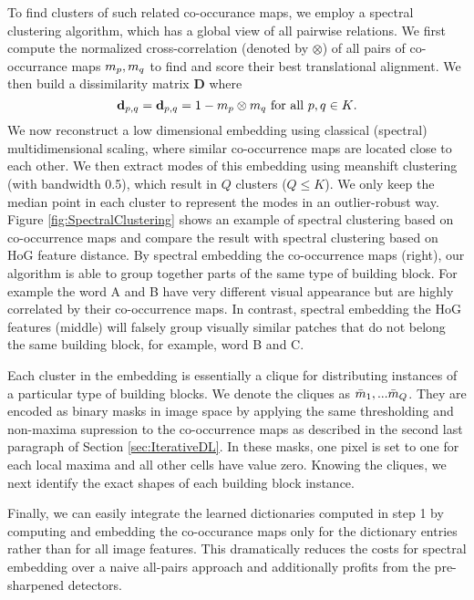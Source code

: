 \documentclass{acmtog}
\begin{document}
To find clusters of such related co-occurance maps, we employ a spectral clustering algorithm, which has a global view of all pairwise relations. We first compute the normalized cross-correlation (denoted by $\otimes$) of all pairs of co-occurrance maps $m_{p},m_{q}$ to find and score their best translational alignment. We then build a dissimilarity matrix $\textbf{D}$ where
%
\begin{equation}
\textbf{d}_{p, q} = \textbf{d}_{p, q} = 1 - m_{p} \otimes m_{q} \text{ for all } p,q \in K\text{.}
\label{eq:distanceMatrix}
\end{equation}
%
We now reconstruct a low dimensional embedding using classical (spectral) multidimensional scaling, where similar co-occurrence maps are located close to each other. We then extract modes of this embedding using meanshift clustering (with bandwidth 0.5), which result in $Q$ clusters ($Q \leq K$). We only keep the median point in each cluster to represent the modes in an outlier-robust way. Figure \ref{fig:SpectralClustering} shows an example of spectral clustering based on co-occurrence maps and compare the result with spectral clustering based on HoG feature distance. By spectral embedding the co-occurrence maps (right), our algorithm is able to group together parts of the same type of building block. For example the word A and B have very different visual appearance but are highly correlated by their co-occurrence maps. In contrast, spectral embedding the HoG features (middle) will falsely group visually similar patches that do not belong the same building block, for example, word B and C.

Each cluster in the embedding is essentially a clique for distributing instances of a particular type of building blocks. We denote the cliques as $\bar{m}_1,...\bar{m}_Q$. They are encoded as binary masks in image space by applying the same thresholding and non-maxima supression to the co-occurrence maps as described in the second last paragraph of Section \ref{sec:IterativeDL}. In these masks, one pixel is set to one for each local maxima and all other cells have value zero. Knowing the cliques, we next identify the exact shapes of each building block instance.  

Finally, we can easily integrate the learned dictionaries computed in step 1 by computing and embedding the co-occurance maps only for the dictionary entries rather than for all image features. This dramatically reduces the costs for spectral embedding over a naive all-pairs approach and additionally profits from the pre-sharpened detectors.
\end{document}
